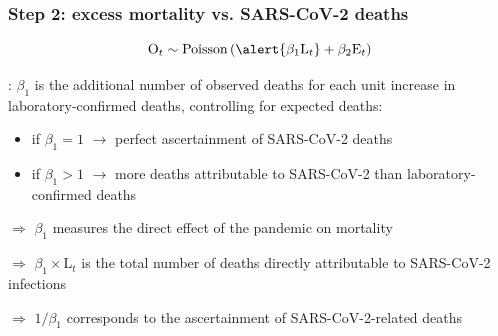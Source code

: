 \documentclass[10pt]{beamer}
\begin{document}
\begin{frame}
\frametitle{Step 2: excess mortality vs. SARS-CoV-2 deaths}
$$\text{O}_{t} \sim \text{Poisson}\left( \alert{\beta_1\text{L}_{t}} + \beta_2\text{E}_{t} \right)$$
\bigskip

\underline{}: $\beta_1$ is the additional number of observed deaths \alert{for each unit increase in laboratory-confirmed deaths}, controlling for expected deaths:
	\begin{itemize}
		\item if $\beta_1=1$ $\rightarrow$ perfect ascertainment of SARS-CoV-2 deaths
		\item if $\beta_1>1$ $\rightarrow$ more deaths attributable to SARS-CoV-2 than laboratory-confirmed deaths
	\end{itemize}
\bigskip

\alert{$\Rightarrow$} $\beta_1$ measures the \alert{direct effect} of the pandemic on mortality 
\bigskip

\alert{$\Rightarrow$} $\beta_1 \times \text{L}_{t}$ is the total number of deaths directly attributable to SARS-CoV-2 infections
\bigskip

\alert{$\Rightarrow$} $1/\beta_1$ corresponds to the ascertainment of SARS-CoV-2-related deaths

\end{frame}
\end{document}
